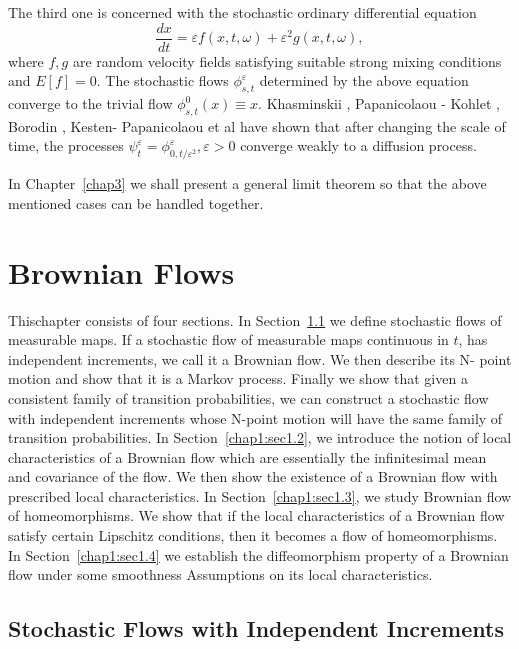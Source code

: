  The third one is concerned with the stochastic ordinary differential
 equation  
 $$
 \frac{dx}{dt} = \varepsilon f(x,t,\omega) + \varepsilon^2 g(x,t,\omega),
 $$
 where $f,g$ are random velocity fields satisfying suitable strong
 mixing conditions and $E[f] = 0$. The stochastic flows
 $\phi^\varepsilon_{s,t}$ determined by the above equation converge to
 the trivial flow $\phi^0_{s,t} (x) \equiv x$. Khasminskii
 \cite{16}, Papanicolaou - Kohlet \cite{28}, Borodin \cite{5}, Kesten- Papanicolaou
 \cite{15} et al have shown that after changing the scale of time, the
 processes $\psi^\varepsilon_t =\phi^\varepsilon_{0,t/\varepsilon^2},
 \varepsilon > 0$ converge weakly to a diffusion process. 
 
 In Chapter~\ref{chap3} we shall present a general limit 
 theorem so that the above mentioned cases can be 
 handled together. 
 


\chapter{Brownian Flows}\label{chap1}
  
  This\pageoriginale chapter consists of four sections. In Section~\ref{chap1:sec1.1} 
  we define
  stochastic flows of measurable maps. If a stochastic flow of
  measurable maps continuous in $t$, has independent increments, we
  call it a Brownian flow. We then describe its N- point motion and
  show that it is a Markov process. Finally we show that given a
  consistent family of transition probabilities, we can construct a
  stochastic flow with independent increments whose N-point motion
  will have the same family of transition probabilities. In 
  Section~\ref{chap1:sec1.2}, we introduce the notion of local 
  characteristics of a
  Brownian flow which are essentially the infinitesimal mean and
  covariance of the flow. We then show the existence of a Brownian
  flow with prescribed local characteristics. In Section~\ref{chap1:sec1.3}, we
  study Brownian flow of homeomorphisms. We show that if the local
  characteristics of a Brownian flow satisfy certain Lipschitz
  conditions, then it becomes a flow of homeomorphisms. In 
  Section~\ref{chap1:sec1.4} we establish the diffeomorphism 
  property of a Brownian flow under some smoothness 
  Assumptions on its local characteristics. 
  
\section{Stochastic Flows with Independent Increments}\label{chap1:sec1.1}
  
